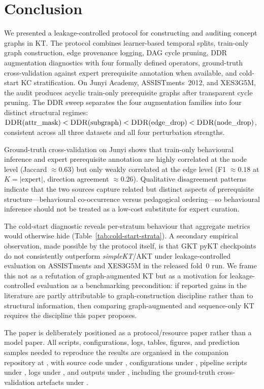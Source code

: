 \documentclass[runningheads]{llncs}
\newcommand{\DDR}{\textsc{DDR}}
\begin{document}
\section{Conclusion}
\label{sec:concl}
We presented a leakage-controlled protocol for constructing and auditing
concept graphs in KT. The protocol combines learner-based temporal
splits, train-only graph construction, edge provenance logging, DAG
cycle pruning, \DDR{} augmentation diagnostics with four formally
defined operators, ground-truth cross-validation against expert
prerequisite annotation when available, and cold-start KC
stratification. On Junyi Academy, ASSISTments~2012, and XES3G5M, the
audit produces acyclic train-only prerequisite graphs after transparent
cycle pruning. The \DDR{} sweep separates the four augmentation
families into four distinct structural regimes:
$\DDR(\text{attr\_mask}) < \DDR(\text{subgraph}) <
\DDR(\text{edge\_drop}) < \DDR(\text{node\_drop})$,
consistent across all three datasets and all four perturbation
strengths.

Ground-truth cross-validation on Junyi shows that train-only
behavioural inference and expert prerequisite annotation are highly
correlated at the node level (Jaccard $\approx 0.63$) but only weakly
correlated at the edge level (F1 $\approx 0.18$ at $K=|\text{expert}|$,
direction agreement $\approx 0.26$). Qualitative disagreement patterns
indicate that the two sources capture related but distinct aspects of
prerequisite structure---behavioural co-occurrence versus pedagogical
ordering---so behavioural inference should not be treated as a
low-cost substitute for expert curation.

The cold-start diagnostic reveals per-stratum behaviour that aggregate
metrics would otherwise hide (Table~\ref{tab:cold-start-strata}). A secondary empirical observation, made
possible by the protocol itself, is that GKT pyKT checkpoints do not
consistently outperform \textit{simpleKT}/AKT under leakage-controlled
evaluation on ASSISTments and XES3G5M in the released fold~0 run. We frame this not as a refutation of
graph-augmented KT but as a motivation for leakage-controlled
evaluation as a benchmarking precondition: if reported gains in the
literature are partly attributable to graph-construction discipline
rather than to structural information, then comparing graph-augmented
and sequence-only KT requires the discipline this paper proposes.

The paper is deliberately positioned as a protocol/resource paper rather
than a model paper. All scripts, configurations, logs, tables, figures,
and prediction samples needed to reproduce the results are organised in
the companion repository at ,
with source code under , configurations under ,
pipeline scripts under , logs under , and
outputs under , including the ground-truth
cross-validation artefacts under .
\end{document}
